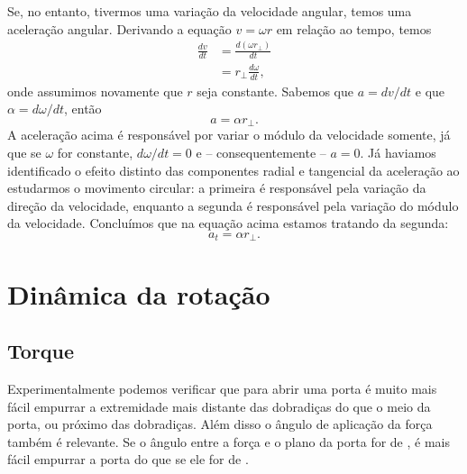 Se, no entanto, tivermos uma variação da velocidade angular, temos uma aceleração angular. Derivando a equação $v = \omega r$ em relação ao tempo, temos
\begin{align}
	\frac{dv}{dt} &= \frac{d(\omega r_\perp)}{dt} \\
	&=r_\perp \frac{d\omega}{dt},
\end{align}
%
onde assumimos novamente que $r$ seja constante. Sabemos que $a=dv/dt$ e que $\alpha = d\omega/dt$, então
\begin{equation}
	a = \alpha r_\perp.
\end{equation}
%
A aceleração acima é responsável por variar o módulo da velocidade somente, já que se $\omega$ for constante, $d\omega/dt = 0$ e -- consequentemente -- $a=0$. Já haviamos identificado o efeito distinto das componentes radial e tangencial da aceleração ao estudarmos o movimento circular: a primeira é responsável pela variação da direção da velocidade, enquanto a segunda é responsável pela variação do módulo da velocidade. Concluímos que na equação acima estamos tratando da segunda:
\begin{equation}
	a_t = \alpha r_\perp.
\end{equation}

\section{Dinâmica da rotação}

\subsection{Torque}

Experimentalmente podemos verificar que para abrir uma porta é muito mais fácil empurrar a extremidade mais distante das dobradiças do que o meio da porta, ou próximo das dobradiças. Além disso o ângulo de aplicação da força também é relevante. Se o ângulo entre a força e o plano da porta for de , é mais fácil empurrar a porta do que se ele for de .

